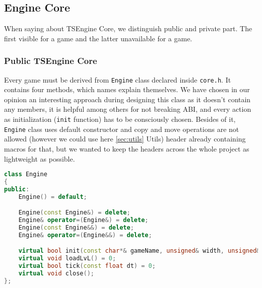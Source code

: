 \newpage
\subsection{Engine Core}
\label{sec:engine_core}
\hspace{\parindent} When saying about TSEngine Core, we distinguish public and private part. The first visible for a game and the latter unavailable for a game.
\subsubsection{Public TSEngine Core}
\label{sec:public_engine}
\hspace{\parindent} Every game must be derived from \texttt{Engine} class declared inside \texttt{core.h}. It contains four methods, which names explain themselves. We have chosen in our opinion an interesting approach during designing this class as it doesn't contain any members, it is helpful among others for not breaking ABI, and every action as initialization (\texttt{init} function) has to be consciously chosen. Besides of it, \texttt{Engine} class uses default constructor and copy and move operations are not allowed (however we could use here \hyperref[sec:utils]{\ref*{sec:utils}} Utils) header already containing macros for that, but we wanted to keep the headers across the whole project as lightweight as possible.\\
\label{lst:engine_class}
\begin{lstlisting}[language=c++, caption=Engine class (./engine/include/tsengine/core.h)]
class Engine
{
public:
    Engine() = default;

    Engine(const Engine&) = delete;
    Engine& operator=(Engine&) = delete;
    Engine(const Engine&&) = delete;
    Engine& operator=(Engine&&) = delete;

    virtual bool init(const char*& gameName, unsigned& width, unsigned& height);
    virtual void loadLvL() = 0;
    virtual bool tick(const float dt) = 0;
    virtual void close();
};
\end{lstlisting}

